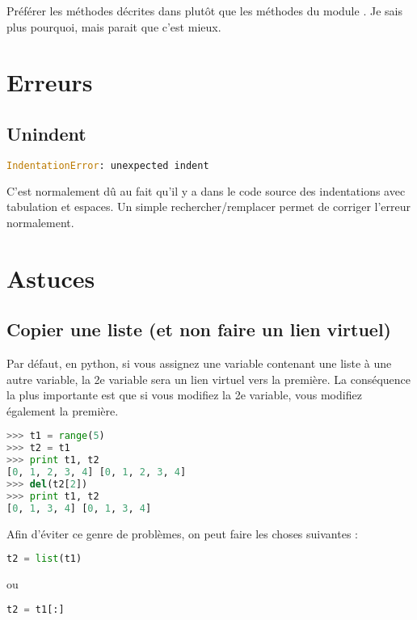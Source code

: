 \documentclass[a4paper,twoside]{article}
\begin{document}
\begin{attention}
Préférer les méthodes décrites dans  plutôt que les méthodes du module . Je sais plus pourquoi, mais parait que c'est mieux.
\end{attention}

\section{Erreurs}
\subsection{Unindent}
\begin{lstlisting}[language=python]
IndentationError: unexpected indent
\end{lstlisting}

C'est normalement dû au fait qu'il y a dans le code source des indentations avec tabulation et espaces. Un simple rechercher/remplacer permet de corriger l'erreur normalement.


\section{Astuces}
\subsection{Copier une liste (et non faire un lien virtuel)}
Par défaut, en python, si vous assignez une variable contenant une liste à une autre variable, la 2e variable sera un lien virtuel vers la première. La conséquence la plus importante est que si vous modifiez la 2e variable, vous modifiez également la première.

\begin{exemple}
\begin{lstlisting}[language=python]
>>> t1 = range(5)
>>> t2 = t1
>>> print t1, t2
[0, 1, 2, 3, 4] [0, 1, 2, 3, 4]
>>> del(t2[2])
>>> print t1, t2
[0, 1, 3, 4] [0, 1, 3, 4]
\end{lstlisting}
\end{exemple}

Afin d'éviter ce genre de problèmes, on peut faire les choses suivantes :
\begin{lstlisting}[language=python]
t2 = list(t1)
\end{lstlisting}
ou
\begin{lstlisting}[language=python]
t2 = t1[:]
\end{lstlisting}
\end{document}
